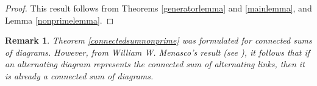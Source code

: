 \documentclass[11pt]{amsart}
\newtheorem{remark}[theorem]{Remark}
\begin{document}
\begin{proof}

    This result follows from Theorems \ref{generatorlemma} and \ref{mainlemma}, and Lemma \ref{nonprimelemma}.
    
\end{proof}

\begin{remark}

    Theorem \ref{connectedsumnonprime}  was formulated for connected sums of diagrams. However, from William W. Menasco's result (see \cite{Men,Hos}), it follows that if an alternating diagram represents the connected sum of alternating links, then it is already a connected sum of diagrams.
    
\end{remark}
\end{document}
